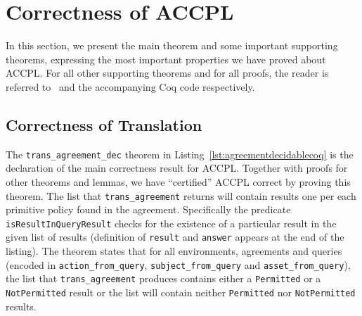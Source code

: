 \documentclass[runningheads,a4paper]{llncs}
\newcommand{\syn}{\texttt}
\begin{document}
\section{Correctness of ACCPL}\label{sec:maintheorems}

In this section, we present the main theorem and some important supporting theorems, expressing the most important
properties we have proved about ACCPL. For all other supporting theorems and
for all proofs, the reader is referred to~\cite{BahPhd} and the accompanying Coq code respectively.

\subsection{Correctness of Translation}\label{sec:correct}

The \syn{trans_agreement_dec} theorem in Listing~\ref{lst:agreementdecidablecoq} is the declaration of the main correctness result for \ac{ACCPL}. Together with proofs for other theorems and lemmas, we have ``certified'' \ac{ACCPL} correct by proving this theorem. The list that \syn{trans_agreement} returns will contain results one per each primitive policy found in the agreement. Specifically the predicate \syn{isResultInQueryResult} checks for the existence of a particular result in the given list of results (definition of \syn{result} and \syn{answer} appears at the end of the listing). The theorem states that for all environments, agreements and queries (encoded in \syn{action_from_query}, \syn{subject_from_query} and \syn{asset_from_query}), the list that \syn{trans_agreement} produces contains either a \syn{Permitted} or a \syn{NotPermitted} result or the list will contain neither \syn{Permitted} nor \syn{NotPermitted} results.
\end{document}
